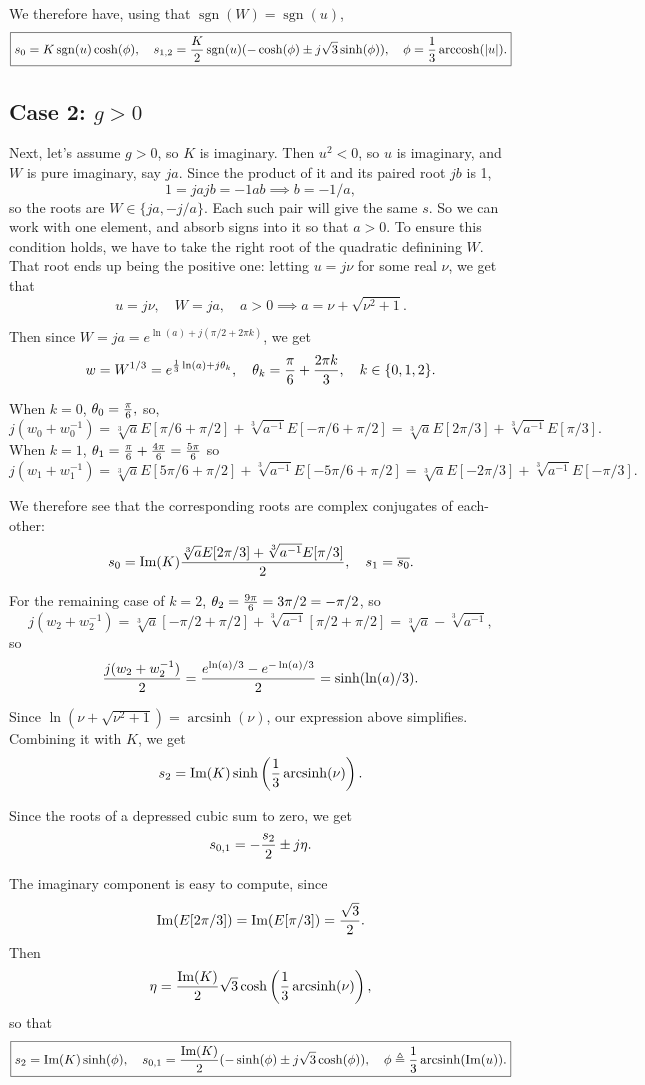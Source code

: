 \documentclass[10pt]{article}
\newcommand{\ol}[1]{\overline{#1}}
\newcommand{\im}{\text{Im}}
\DeclareMathOperator*{\arcsinh}{arcsinh}
\DeclareMathOperator*{\arccosh}{arccosh}
\DeclareMathOperator*{\sign}{sgn}
\begin{document}
We therefore have, using that $\sign(W) = \sign(u)$, $$ \boxed{s_0 = K \sign(u) \cosh(\phi), \quad s_{1,2} ={K \over 2}\sign(u)(-\cosh(\phi) \pm j\sqrt{3} \sinh(\phi)), \quad \phi = {1 \over 3} \arccosh(|u|).}$$

\subsection*{Case 2: $g > 0$}
Next, let's assume $g > 0$, so $K$ is imaginary. Then $u^2 < 0$, so $u$ is imaginary, and $W$ is pure imaginary, say $j a$. Since the product of it and its paired root $j b$ is 1, $$ 1 = j a j b = -1 a b \implies b = -1/a,$$ so the roots are $W \in \{j a, -j/a\}$. Each such pair will give the same $s$. So we can work with one element, and absorb signs into it so that $a > 0$.  To ensure this condition holds, we have to take the right root of the quadratic definining $W$. That root ends up being the positive one: letting $u = j \nu$ for some real $\nu$, we get that $$u = j\nu, \quad W = j a, \quad a > 0 \implies a = \nu + \sqrt{\nu^2 + 1}.$$ 

Then since $ W = j a = e^{\ln(a) + j (\pi/2 + 2\pi k)}$, we get $$w = W^{1/3} = e^{{1 \over 3} \ln(a) + j \theta_k}, \quad \theta_k = {\pi \over 6} + {2\pi k \over 3}, \quad k \in \{0, 1, 2\}.$$ 

When $k = 0$, $\theta_0 = {\pi \over 6},$ so, $$j (w_0 + w_0^{-1}) = \sqrt[3]{a}E[\pi/6 + \pi/2] + \sqrt[3]{a^{-1}} E[-\pi/6 + \pi/2] = \sqrt[3]{a}E[2\pi/3] + \sqrt[3]{a^{-1}}E[\pi/3].$$
When $k = 1$, $\theta_1 = {\pi \over 6} + {4\pi \over 6} = {5 \pi \over 6}$ so $$ j(w_1 + w_1^{-1}) = \sqrt[3]{a}E[5 \pi/6 + \pi/2] + \sqrt[3]{a^{-1}}E[-5\pi/6 + \pi/2] = \sqrt[3]{a} E[-2\pi/3] + \sqrt[3]{a^{-1}}E[-\pi/3].$$

We therefore see that the corresponding roots are complex conjugates of each-other:
$$ s_0 = \im(K) { \sqrt[3]{a}E[2\pi/3] + \sqrt[3]{a^{-1}}E[\pi/3] \over 2}, \quad s_1 = \ol{s_0}.$$

For the remaining case of $ k = 2$, $\theta_2 = {9\pi \over 6} = {3\pi/2}=-{\pi/2}$, so
$$ j(w_2 + w_2^{-1}) = \sqrt[3]{a}[-{\pi/2} + \pi/2] + \sqrt[3]{a^{-1}}[\pi/2 + \pi/2] = \sqrt[3]{a} - \sqrt[3]{a^{-1}},$$
so $$ {j (w_2 + w_2^{-1}) \over 2} = {e^{\ln(a)/3} - e^{-\ln(a)/3} \over 2} = \sinh(\ln(a)/3).$$

Since $\ln(\nu + \sqrt{\nu^2+1}) = \arcsinh(\nu)$, our expression above simplifies. Combining it with $K$, we get $$ s_2 = \im(K) \sinh\left({1\over 3}\arcsinh(\nu)\right).$$

Since the roots of a depressed cubic sum to zero, we get $$ s_{0,1} = -{s_2 \over 2} \pm j \eta.$$

The imaginary component is easy to compute, since $$ \im(E[2\pi/3]) = \im(E[\pi/3]) = {\sqrt{3} \over 2}.$$ Then $$\eta = {\im(K) \over 2}\sqrt{3} \cosh\left({1 \over 3} \arcsinh(\nu)\right),$$ so that $$\boxed{s_2 = \im(K) \sinh(\phi), \quad s_{0,1} = {\im(K) \over 2}(-\sinh(\phi) \pm j \sqrt{3} \cosh(\phi)), \quad \phi \triangleq {1 \over 3} \arcsinh(\im(u)).}$$
\end{document}
